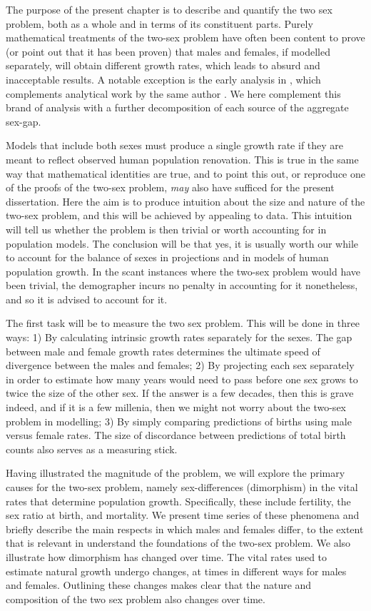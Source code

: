 \label{ch:Measuring}
The purpose of the present chapter is to describe and quantify the two sex
problem, both as a whole and in terms of its constituent parts. Purely
mathematical treatments of the two-sex problem have often been content to 
prove (or point out that it has been proven) that males and females,
if modelled separately, will obtain different growth rates, which leads to
absurd and inacceptable results. A notable exception is the early analysis in
\citet{karmel1948analysis}, which complements analytical work by the same author
\citep{karmel1947relations,karmel1948relations}. We here complement this brand
of analysis with a further decomposition of each source of the aggregate
sex-gap. 

Models that include both sexes must produce a single growth 
rate if they are meant to reflect observed human population renovation. 
This is true in the same way that mathematical identities are true, and to 
point this out, or reproduce one of the proofs of the two-sex problem, \textit{may} 
also have sufficed for the present dissertation. Here the aim is to produce intuition 
about the size and nature of the two-sex problem, and this will be
achieved by appealing to data. This intuition will tell us whether the 
problem is then trivial or worth accounting for in
population models. The conclusion will be that yes, it is usually worth our
while to account for the balance of sexes in projections and in models of human
population growth. In the scant instances where the two-sex problem would have
been trivial, the demographer incurs no penalty in accounting for it
nonetheless, and so it is advised to account for it.

The first task will be to measure the two sex problem. This will be done in
three ways: 1) By calculating intrinsic growth rates separately for the sexes.
The gap between male and female growth rates determines the ultimate speed of
divergence between the males and females; 2) By projecting each sex separately
in order to estimate how many years would need to pass before one sex grows to
twice the size of the other sex. If the answer is a few decades, then this is
grave indeed, and if it is a few millenia, then we might not worry about the
two-sex problem in modelling; 3) By simply comparing predictions of births using
male versus female rates. The size of discordance between predictions of total
birth counts also serves as a measuring stick.

Having illustrated the magnitude of the problem, we will explore the primary
causes for the two-sex problem, namely sex-differences (dimorphism) in the vital rates
that determine population growth. Specifically, these include fertility, the sex
ratio at birth, and mortality. We present time series of these phenomena and
briefly describe the main respects in which males and females differ, to the
extent that is relevant in understand the foundations of the two-sex problem. We
also illustrate how dimorphism has changed over time. The vital rates
used to estimate natural growth undergo changes, at times in different ways for
males and females. Outlining these changes makes clear that the nature and
composition of the two sex problem also changes over time.

